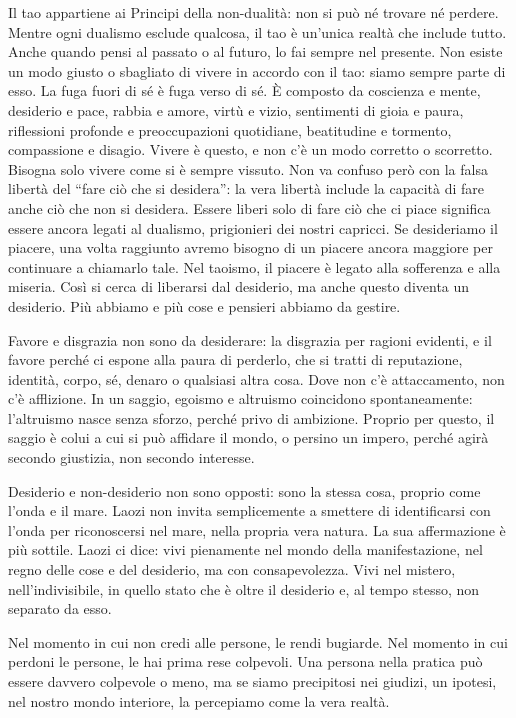 \documentclass[12pt]{book} %
\begin{document}
Il tao appartiene ai Principi della non-dualità: non si può né trovare né perdere. Mentre ogni dualismo esclude qualcosa, il tao è un'unica realtà che include tutto. Anche quando pensi al passato o al futuro, lo fai sempre nel presente. Non esiste un modo giusto o sbagliato di vivere in accordo con il tao: siamo sempre parte di esso. La fuga fuori di sé è fuga verso di sé.
È composto da coscienza e mente, desiderio e pace, rabbia e amore, virtù e vizio, sentimenti di gioia e paura, riflessioni profonde e preoccupazioni quotidiane, beatitudine e tormento, compassione e disagio. Vivere è questo, e non c’è un modo corretto o scorretto. Bisogna solo vivere come si è sempre vissuto.
Non va confuso però con la falsa libertà del “fare ciò che si desidera”: la vera libertà include la capacità di fare anche ciò che non si desidera. Essere liberi solo di fare ciò che ci piace significa essere ancora legati al dualismo, prigionieri dei nostri capricci.
Se desideriamo il piacere, una volta raggiunto avremo bisogno di un piacere ancora maggiore per continuare a chiamarlo tale. Nel taoismo, il piacere è legato alla sofferenza e alla miseria. Così si cerca di liberarsi dal desiderio, ma anche questo diventa un desiderio. Più abbiamo e più cose e pensieri abbiamo da gestire.

Favore e disgrazia non sono da desiderare: la disgrazia per ragioni evidenti, e il favore perché ci espone alla paura di perderlo, che si tratti di reputazione, identità, corpo, sé, denaro o qualsiasi altra cosa.
Dove non c'è attaccamento, non c'è afflizione.
In un saggio, egoismo e altruismo coincidono spontaneamente: l’altruismo nasce senza sforzo, perché privo di ambizione.
Proprio per questo, il saggio è colui a cui si può affidare il mondo, o persino un impero, perché agirà secondo giustizia, non secondo interesse.

Desiderio e non-desiderio non sono opposti: sono la stessa cosa, proprio come l’onda e il mare.
Laozi non invita semplicemente a smettere di identificarsi con l’onda per riconoscersi nel mare, nella propria vera natura. La sua affermazione è più sottile.
Laozi ci dice: vivi pienamente nel mondo della manifestazione, nel regno delle cose e del desiderio, ma con consapevolezza. Vivi nel mistero, nell’indivisibile, in quello stato che è oltre il desiderio e, al tempo stesso, non separato da esso.

Nel momento in cui non credi alle persone, le rendi bugiarde.
Nel momento in cui perdoni le persone, le hai prima rese colpevoli.
Una persona nella pratica può essere davvero colpevole o meno, ma se siamo precipitosi nei giudizi, un ipotesi, nel nostro mondo interiore, la percepiamo come la vera realtà.
\end{document}
